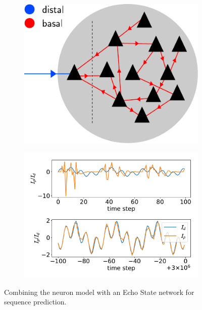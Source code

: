 \documentclass{beamer}
\begin{document}
\begin{frame}[t]
\begin{columns}[t]
\begin{column}{.5\textwidth}

\begin{figure}
\begin{subfigure}{0.44\textwidth}
\includegraphics[width=\textwidth]{../figures/illustration_echo_state.pdf}
\end{subfigure}
\begin{subfigure}{0.55\textwidth}
\includegraphics[width=\textwidth]{../figures/fig4_right.pdf}
\end{subfigure}
\caption{Combining the neuron model with an Echo State network for sequence prediction.}
\label{fig:Results_4}
\end{figure}


\end{column}
\end{columns}
\end{frame}
\end{document}
